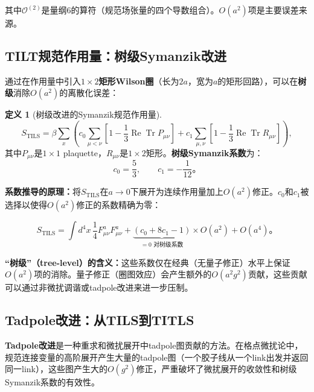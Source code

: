 \documentclass[12pt,a4paper]{ctexart}
\theoremstyle{definition}
\newtheorem{definition}{定义}[section]
\begin{document}
其中$\mathcal{O}^{(2)}$是量纲6的算符（规范场张量的四个导数组合）。$O(a^2)$项是主要误差来源。

\subsection{TILT规范作用量：树级Symanzik改进}

通过在作用量中引入\textbf{$1\times2$矩形Wilson圈}（长为$2a$，宽为$a$的矩形回路），可以在\textbf{树级}消除$O(a^2)$的离散化误差\cite{CLQCD2025quark_mass,Chen2025gluon}：

\begin{definition}[树级改进的Symanzik规范作用量]
\begin{equation}
\boxed{S_{\text{TILS}} = \beta \sum_x \left( c_0 \sum_{\mu<\nu} \left[1 - \frac{1}{3}\operatorname{Re}\operatorname{Tr} P_{\mu\nu}\right] + c_1 \sum_{\mu,\nu} \left[1 - \frac{1}{3}\operatorname{Re}\operatorname{Tr} R_{\mu\nu}\right] \right)},
\label{eq:TILS_action}
\end{equation}
其中$P_{\mu\nu}$是$1\times1$ plaquette，$R_{\mu\nu}$是$1\times2$矩形。\textbf{树级Symanzik系数}为：
\begin{equation}
\boxed{c_0 = \frac{5}{3}, \qquad c_1 = -\frac{1}{12}}。
\label{eq:tree_level_coefficients}
\end{equation}
\end{definition}

\textbf{系数推导的原理：}将$S_{\text{TILS}}$在$a \to 0$下展开为连续作用量加上$O(a^2)$修正。$c_0$和$c_1$被选择以使得$O(a^2)$修正的系数精确为零：

\begin{equation}
S_{\text{TILS}} = \int d^4x\, \frac{1}{4}F^a_{\mu\nu}F^a_{\mu\nu} + \underbrace{(c_0 + 8c_1 - 1)}_{=0\text{ 对树级系数}} \times O(a^2) + O(a^4)。
\end{equation}

\textbf{``树级''（tree-level）的含义：}这些系数仅在经典（无量子修正）水平上保证$O(a^2)$项的消除。量子修正（圈图效应）会产生额外的$O(a^2 g^2)$贡献，这些贡献可以通过非微扰调谐或tadpole改进来进一步压制。

\subsection{Tadpole改进：从TILS到TITLS}

\textbf{Tadpole改进}\cite{CLQCD2025quark_mass,CLQCD2024charm}是一种重求和微扰展开中tadpole图贡献的方法。在格点微扰论中，规范连接变量的高阶展开产生大量的tadpole图（一个胶子线从一个link出发并返回同一link），这些图产生大的$O(g^2)$修正，严重破坏了微扰展开的收敛性和树级Symanzik系数的有效性。
\end{document}
